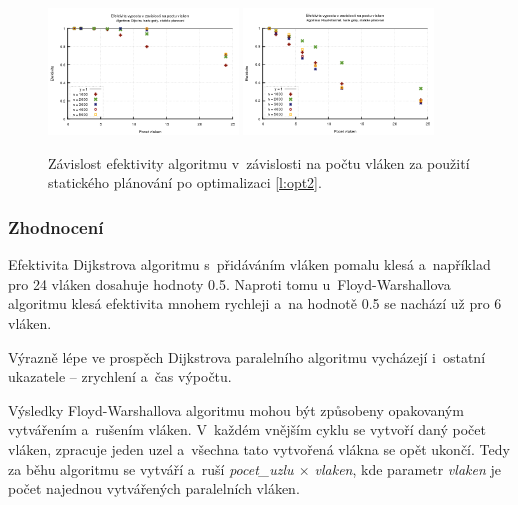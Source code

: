 \begin{figure}
    \centering
    \includegraphics[width=0.45\textwidth]{../grafy/02_openMP/02-03-Dijkstra_efektivita_v3}
    \includegraphics[width=0.45\textwidth]{../grafy/02_openMP/02-03-Floyd_efektivita_v3}
    \caption{Závislost efektivity algoritmu v~závislosti na počtu vláken za použití statického plánování po optimalizaci \ref{l:opt2}.}
    \label{f:mer:efe:opt2}
\end{figure}

\subsubsection{Zhodnocení}
Efektivita Dijkstrova algoritmu s~přidáváním vláken pomalu klesá a~například pro 24 vláken dosahuje hodnoty 0.5. Naproti tomu u~Floyd-Warshallova algoritmu klesá efektivita mnohem rychleji a~na hodnotě 0.5 se nachází už pro 6 vláken. 

Výrazně lépe ve prospěch Dijkstrova paralelního algoritmu vycházejí i~ostatní ukazatele -- zrychlení a~čas výpočtu.

Výsledky Floyd-Warshallova algoritmu mohou být způsobeny opakovaným vytvářením a~rušením vláken. V~každém vnějším cyklu se vytvoří daný počet vláken, zpracuje jeden uzel a~všechna tato vytvořená vlákna se opět ukončí. Tedy za běhu algoritmu se vytváří a~ruší \textit{pocet\_uzlu $\times$ vlaken}, kde parametr \textit{vlaken} je počet najednou vytvářených paralelních vláken.



